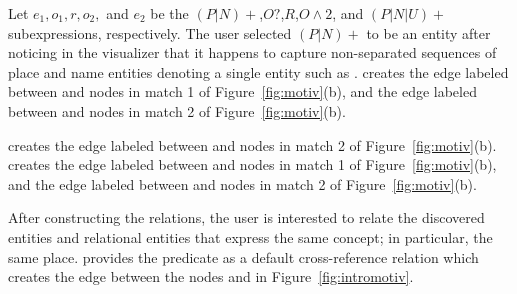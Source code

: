 Let $e_1,o_1,r,o_2,$ and $e_2$ be the 
$(P|N)+$,$O?$,$R$,$O\wedge 2$, and $(P|N|U)+$ subexpressions, respectively.
The user selected $(P|N)+$ to be an entity after noticing in the visualizer  
that it happens to capture 
non-separated sequences of place and name entities denoting a single 
entity such as . 
 creates the 
edge labeled  between  and 
 nodes in match 1 of Figure~\ref{fig:motiv}(b), and the 
edge labeled  between  and  nodes in 
match 2 of Figure~\ref{fig:motiv}(b).

 creates the edge labeled  
between  and  nodes in match 2 of Figure~\ref{fig:motiv}(b). 
 creates the edge labeled  
between  and  nodes in 
match 1 of Figure~\ref{fig:motiv}(b), and the 
edge labeled  between  and  
nodes in match 2 of Figure~\ref{fig:motiv}(b).

After constructing the relations, 
the user is interested to relate the discovered entities and relational entities
that express the same concept; in particular, the same place. 
\framework provides the  predicate as a default cross-reference
relation which creates the edge between the nodes  and 
 in  Figure~\ref{fig:intromotiv}.
